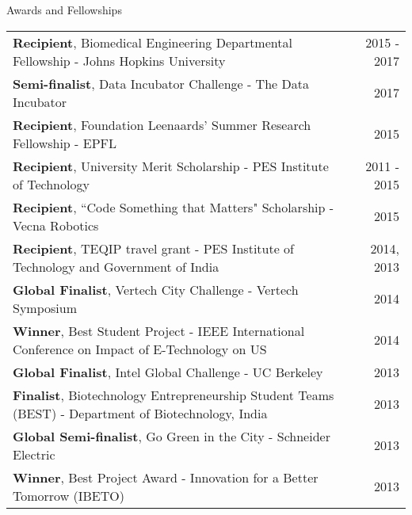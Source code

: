 \documentclass{resume}
\begin{document}
        \begin{rSection}{Awards and Fellowships}
\begin{tabular*}{\textwidth}{@{\extracolsep{\fill}}lr@{}}
\textbf{Recipient}, Biomedical Engineering Departmental Fellowship - Johns Hopkins University & 2015 - 2017\\ 
\textbf{Semi-finalist}, Data Incubator Challenge - The Data Incubator & 2017\\
\textbf{Recipient}, Foundation Leenaards' Summer Research Fellowship - EPFL &  2015\\
\textbf{Recipient}, University Merit Scholarship - PES Institute of Technology & 2011 - 2015 \\ 
\textbf{Recipient}, ``Code Something that Matters" Scholarship - Vecna Robotics & 2015\\
\textbf{Recipient}, TEQIP travel grant - PES Institute of Technology and Government of India& 2014, 2013 \\ 
\textbf{Global Finalist}, Vertech City Challenge - Vertech Symposium  & 2014\\
\textbf{Winner}, Best Student Project - IEEE International Conference on Impact of E-Technology on US & 2014\\
\textbf{Global Finalist}, Intel Global Challenge -  UC Berkeley & 2013 \\
\textbf{Finalist}, Biotechnology Entrepreneurship Student Teams (BEST) - Department of Biotechnology, India & 2013\\
\textbf{Global Semi-finalist}, Go Green in the City - Schneider Electric & 2013 \\
\textbf{Winner}, Best Project Award - Innovation for a Better Tomorrow (IBETO)  & 2013\\
\end{tabular*}
    \end{rSection}

  \vspace{1em}
\end{document}
